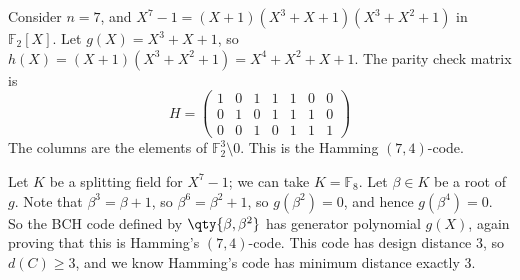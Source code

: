 \begin{example}
    Consider $n = 7$, and $X^7 - 1 = (X + 1)(X^3 + X + 1)(X^3 + X^2 + 1)$ in $\mathbb F_2[X]$.
    Let $g(X) = X^3 + X + 1$, so $h(X) = (X + 1)(X^3 + X^2 + 1) = X^4 + X^2 + X + 1$.
    The parity check matrix is
    \[ H = \begin{pmatrix}
        1 & 0 & 1 & 1 & 1 & 0 & 0 \\
        0 & 1 & 0 & 1 & 1 & 1 & 0 \\
        0 & 0 & 1 & 0 & 1 & 1 & 1
    \end{pmatrix} \]
    The columns are the elements of $\mathbb F_2^3 \setminus \qty{0}$.
    This is the Hamming $(7,4)$-code.

    Let $K$ be a splitting field for $X^7 - 1$; we can take $K = \mathbb F_8$.
    Let $\beta \in K$ be a root of $g$.
    Note that $\beta^3 = \beta + 1$, so $\beta^6 = \beta^2 + 1$, so $g(\beta^2) = 0$, and hence $g(\beta^4) = 0$.
    So the BCH code defined by $\qty{\beta, \beta^2}$ has generator polynomial $g(X)$, again proving that this is Hamming's $(7,4)$-code.
    This code has design distance $3$, so $d(C) \geq 3$, and we know Hamming's code has minimum distance exactly 3.
\end{example}

